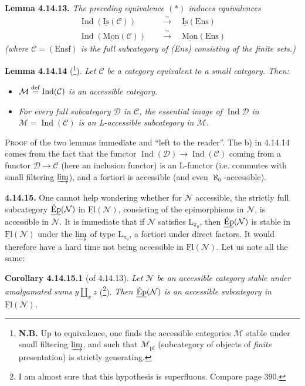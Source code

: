 \documentclass[11pt]{article}
\newcommand{\msp}[1]{\marginpar{\footnotesize [#1]}}
\newcommand{\uFl}{\underline{\mathrm{Fl}}}
\newcommand{\uIs}{\underline{\mathrm{Is}}}
\newcommand{\uMon}{\underline{\mathrm{Mon}}}
\newcommand{\uEp}{\underline{\textup{Ép}}}
\newcommand{\defeq}{\overset{\textup{def}}{=}}
\newcommand{\Ind}{\operatorname{Ind}}
\newcommand{\Ens}{\mathrm{Ens}}
\begin{document}
\textbf{Lemma 4.14.13.} \textit{The preceding equivalence $(*)$ induces equivalences}
\[
\begin{aligned}
\Ind(\uIs(\mathcal{C})) \quad &\xrightarrow{\ \sim\ } \quad \uIs(\Ens) \\
\Ind(\uMon(\mathcal{C})) \quad &\xrightarrow{\ \sim\ } \quad \uMon(\Ens)
\end{aligned}
\]
\textit{(where $\mathcal{C} = (\mathrm{Ensf})$ is the full subcategory of \textup{(Ens)} consisting of the \textup{finite} sets.)}

\textbf{Lemma 4.14.14} (\footnote[166]{\textbf{N.B.} Up to equivalence, one finds the accessible categories $\mathcal{M}$ stable under small filtering $\varinjlim$, and such that $\mathcal{M}_{\mathrm{pf}}$ (subcategory of objects of \textit{finite} presentation) is strictly generating.}). \textit{Let $\mathcal{C}$ be a category equivalent to a small category. Then:}
\begin{itemize}[nosep]
\item[\textit{a)}] \textit{$\mathcal{M} \defeq \Ind(\mathcal{C})$ is an accessible category.}
\item[\textit{b)}] \textit{For every full subcategory $\mathcal{D}$ in $\mathcal{C}$, the essential image of $\Ind\mathcal{D}$ in $\mathcal{M} = \Ind(\mathcal{C})$ is an L-accessible subcategory in $\mathcal{M}$.}
\end{itemize}
\textsc{Proof} of the two lemmas immediate and ``left to the reader''. The b) in 4.14.14 comes from the fact that the functor $\Ind(\mathcal{D}) \longrightarrow \Ind(\mathcal{C})$ coming from a functor $\mathcal{D} \longrightarrow \mathcal{C}$ (here an
\msp{page 387}
inclusion functor) is an L-functor (i.e. commutes with small filtering $\varinjlim$), and a fortiori is accessible (and even $\aleph_0$-accessible).

\textbf{4.14.15.} One cannot help wondering whether for $\mathcal{N}$ accessible, the strictly full subcategory $\uEp(\mathcal{N})$ in $\uFl(\mathcal{N})$, consisting of the epimorphisms in $\mathcal{N}$, is accessible in $\mathcal{N}$. It is immediate that if $\mathcal{N}$ satisfies $\mathrm{L}_{\pi_0}$, then $\uEp(\mathcal{N})$ is stable in $\uFl(\mathcal{N})$ under the $\varinjlim$ of type $\mathrm{L}_{\pi_0}$, a fortiori under direct factors. It would therefore have a hard time not being accessible in $\uFl(\mathcal{N})$. Let us note all the same: %

\textbf{Corollary 4.14.15.1} (of 4.14.13). \textit{Let $\mathcal{N}$ be an accessible category stable under amalgamated sums $y \amalg_x z$} (\footnote[167]{I am almost sure that this hypothesis is superfluous. Compare page 390.}). \textit{Then $\uEp(\mathcal{N})$ is an accessible subcategory in $\uFl(\mathcal{N})$.}
\end{document}
